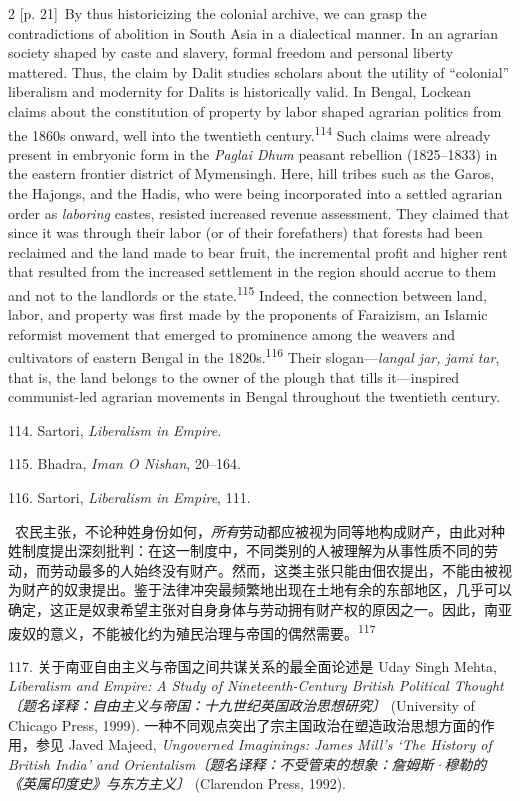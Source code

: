 \documentclass[10pt,a4paper]{article}
\begin{document}
\begin{paracol}{2}
{\scriptsize\color{gray} [p. 21]}\ By thus historicizing the colonial archive, we can grasp the contradictions of abolition in South Asia in a dialectical manner. In an agrarian society shaped by caste and slavery, formal freedom and personal liberty mattered. Thus, the claim by Dalit studies scholars about the utility of “colonial” liberalism and modernity for Dalits is historically valid. In Bengal, Lockean claims about the constitution of property by labor shaped agrarian politics from the 1860s onward, well into the twentieth century.\nobreak\textsuperscript{114} Such claims were already present in embryonic form in the \textit{Paglai Dhum} peasant rebellion (1825–1833) in the eastern frontier district of Mymensingh. Here, hill tribes such as the Garos, the Hajongs, and the Hadis, who were being incorporated into a settled agrarian order as \textit{laboring} castes, resisted increased revenue assessment. They claimed that since it was through their labor (or of their forefathers) that forests had been reclaimed and the land made to bear fruit, the incremental profit and higher rent that resulted from the increased settlement in the region should accrue to them and not to the landlords or the state.\nobreak\textsuperscript{115} Indeed, the connection between land, labor, and property was first made by the proponents of Faraizism, an Islamic reformist movement that emerged to prominence among the weavers and cultivators of eastern Bengal in the 1820s.\nobreak\textsuperscript{116} Their slogan—\textit{langal jar, jami tar}, that is, the land belongs to the owner of the plough that tills it—inspired communist-led agrarian movements in Bengal throughout the twentieth century.\par{\small 114. Sartori, \textit{Liberalism in Empire.}\par}{\small 115. Bhadra, \textit{Iman O Nishan}, 20–164.\par}{\small 116. Sartori, \textit{Liberalism in Empire}, 111.\par}
\switchcolumn*
{\scriptsize\color{gray} [p. 22]}\ 农民主张，不论种姓身份如何，\textit{所有}劳动都应被视为同等地构成财产，由此对种姓制度提出深刻批判：在这一制度中，不同类别的人被理解为从事性质不同的劳动，而劳动最多的人始终没有财产。然而，这类主张只能由佃农提出，不能由被视为财产的奴隶提出。鉴于法律冲突最频繁地出现在土地有余的东部地区，几乎可以确定，这正是奴隶希望主张对自身身体与劳动拥有财产权的原因之一。因此，南亚废奴的意义，不能被化约为殖民治理与帝国的偶然需\mbox{要。\textsuperscript{117}}\par{\small 117. 关于南亚自由主义与帝国之间共谋关系的最全面论述是 Uday Singh Mehta, \textit{Liberalism and Empire: A Study of Nineteenth-Century British Political Thought〔题名译释：自由主义与帝国：十九世纪英国政治思想研究〕} (University of Chicago Press, 1999). 一种不同观点突出了宗主国政治在塑造政治思想方面的作用，参见 Javed Majeed, \textit{Ungoverned Imaginings: James Mill’s ‘The History of British India’ and Orientalism〔题名译释：不受管束的想象：詹姆斯·穆勒的《英属印度史》与东方主义〕} (Clarendon Press, 1992).\par}

\end{paracol}
\end{document}
